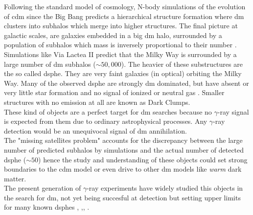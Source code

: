 \documentclass[main.tex]{subfiles}
\begin{document}
Following the standard model of cosmology, N-body simulations of the evolution of \gls{cdm} since the Big Bang predicts a hierarchical structure formation where \gls{dm} clusters into subhalos which merge into higher structures. The final picture at galactic scales, are galaxies embedded in a big \gls{dm} halo, surrounded by a population of subhalos which mass is inversely proportional to their number \cite{2008DMhalossubhalosDSphe}. Simulations like Via Lactea II predict that the Milky Way is surrounded by a large number of \gls{dm} subhalos ($\sim 50,000$). The heavier of these substructures are the so called \gls{dsphe}. They are very faint galaxies (in optical) orbiting the Milky Way. Many of the observed \gls{dsphe} are strongly \gls{dm} dominated, but have absent or very little star formation and no signal of ionized or neutral gas \cite{2007Dwarfs}. Smaller structures with no emission at all are known as Dark Clumps. \\
These kind of objects are a perfect target for \gls{dm} searches because no $\gamma$-ray signal is expected from them due to ordinary astrophysical processes. Any $\gamma$-ray detection would be an unequivocal signal of \gls{dm} annihilation. \\
The "missing satellites problem" accounts for the discrepancy between the large number of predicted subhalos by simulations and the actual number of detected \gls{dsphe} ($\sim 50$) hence the study and understanding of these objects could set strong boundaries to the \gls{cdm} model or even drive to other \gls{dm} models like \textit{warm} dark matter. 
\\
The present generation of $\gamma$-ray experiments have widely studied this objects in the search for \gls{dm}, not yet being succesful at detection but setting upper limits for many known \glspl{dsphe}  \cite{2010DSpheFermi}, \cite{2014DSpheHESS},\cite{2018DSpheMAGIC}, \cite{2017DSpheVERITAS} .
\end{document}
